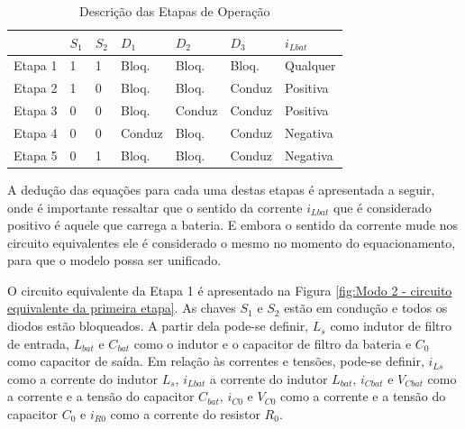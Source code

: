 \begin{table}[h]
\caption{Descrição das Etapas de Operação}
\label{tab:01}
\begin{tabular}{lllllll}
\hline
        & $S_1$ & $S_2$ & $D_1$       & $D_2$       & $D_3$       & $i_{Lbat}$ \\ \hline
Etapa 1 & 1  & 1  & Bloq. & Bloq. & Bloq. & Qualquer   \\
Etapa 2 & 1  & 0  & Bloq. & Bloq. & Conduz   & Positiva   \\
Etapa 3 & 0  & 0  & Bloq. & Conduz   & Conduz   & Positiva   \\
Etapa 4 & 0  & 0  & Conduz   & Bloq. & Conduz   & Negativa    \\
Etapa 5 & 0  & 1  & Bloq. & Bloq. & Conduz   & Negativa   \\ \hline
\end{tabular}
\end{table}


A dedução das equações para cada uma destas etapas é apresentada a seguir, onde é importante ressaltar que o sentido da corrente $i_{Lbat}$ que é considerado positivo é aquele que carrega a bateria. E embora o sentido da corrente mude nos circuito equivalentes ele é considerado o mesmo no momento do equacionamento, para que o modelo possa ser unificado. 

%

O circuito equivalente da Etapa 1 é apresentado na Figura \ref{fig:Modo 2 - circuito equivalente da primeira etapa}. As chaves $S_1$ e $S_2$ estão em condução e todos os diodos estão bloqueados. A partir dela pode-se definir, $L_s$ como indutor de filtro de entrada, $L_{bat}$ e $C_{bat}$ como o indutor e o capacitor de filtro da bateria e $C_0$ como capacitor de saída. Em relação às correntes e tensões, pode-se definir, $i_{Ls}$ como a corrente do indutor $L_s$, $i_{Lbat}$ a corrente do indutor $L_{bat}$, $i_{Cbat}$ e $V_{Cbat}$ como a corrente e a tensão do capacitor $C_{bat}$, $i_{C0}$ e $V_{C0}$  como a corrente e a tensão do capacitor $C_0$ e $i_{R0}$ como a corrente do resistor $R_0$.


